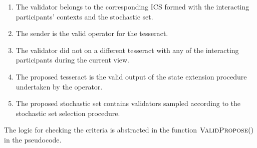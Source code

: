 \begin{enumerate}
    \item The validator belongs to the corresponding ICS formed with the interacting participants' contexts and the stochastic set. 
    \item The sender is the valid operator for the tesseract. 
    \item The validator did not  on a different tesseract with any of the interacting participants during the current view. 
    \item The proposed tesseract is the valid output of the state extension procedure undertaken by the operator. 
    \item The proposed stochastic set contains validators sampled according to the stochastic set selection procedure. 
\end{enumerate}

The logic for checking the criteria is abstracted in the function $\mathrm{\textsc{ValidPropose}}()$ in the pseudocode.



